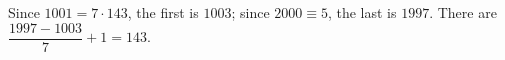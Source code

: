 Since $1001=7\cdot143$, the first is $1003$; since $2000\equiv5$, the last is $1997$. There are $\dfrac{1997-1003}7+1=\boxed{143}$.
